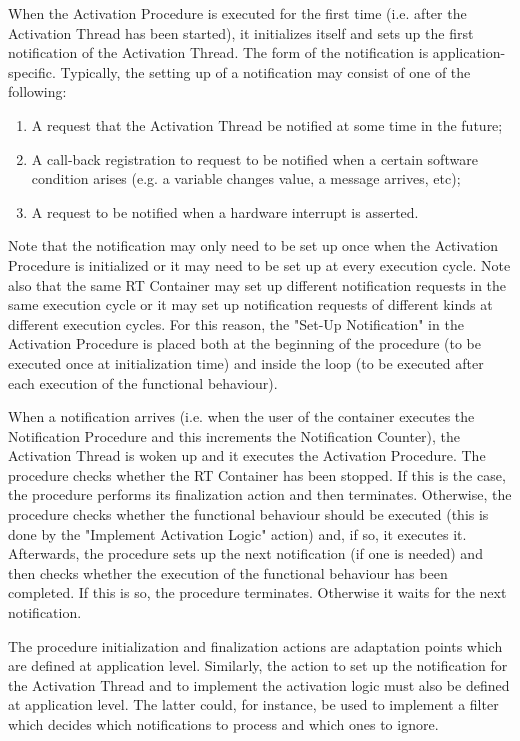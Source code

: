 When the Activation Procedure is executed for the first time (i.e. after the Activation Thread
has been started), it initializes itself and sets up the first notification of the Activation Thread.
The form of the notification is application-specific. Typically, the setting up of a notification
may consist of one of the following:

\begin{enumerate} 
\item A request that the Activation Thread be notified at some time in the future;
\item A call-back registration to request to be notified when a certain software condition
arises (e.g. a variable changes value, a message arrives, etc);
\item A request to be notified when a hardware interrupt is asserted.
\end{enumerate}

Note that the notification may only need to be set up once when the Activation Procedure is initialized or it may need to be set up at every execution cycle. Note also that the same RT Container may set up different notification requests in the same execution cycle or it may set up notification requests of different kinds at different execution cycles. For this reason, the "Set-Up Notification" in the Activation Procedure is placed both at the beginning of the procedure (to be executed once at initialization time) and inside the loop (to be executed after each execution of the functional behaviour).

When a notification arrives (i.e. when the user of the container executes the Notification Procedure and this increments the Notification Counter), the Activation Thread is woken up and it executes the Activation Procedure. The procedure checks whether the RT Container has been stopped. If this is the case, the procedure performs its finalization action and then terminates. Otherwise, the procedure checks whether the functional behaviour should be executed (this is done by the "Implement Activation Logic" action) and, if so, it executes it. Afterwards, the procedure sets up the next notification (if one is needed) and then checks whether the execution of the functional behaviour has been completed. If this is so, the procedure terminates. Otherwise it waits for the next notification.

The procedure initialization and finalization actions are adaptation points which are defined at application level. Similarly, the action to set up the notification for the Activation Thread and to implement the activation logic must also be defined at application level. The latter could, for instance, be used to implement a filter which decides which notifications to process and which ones to ignore.

